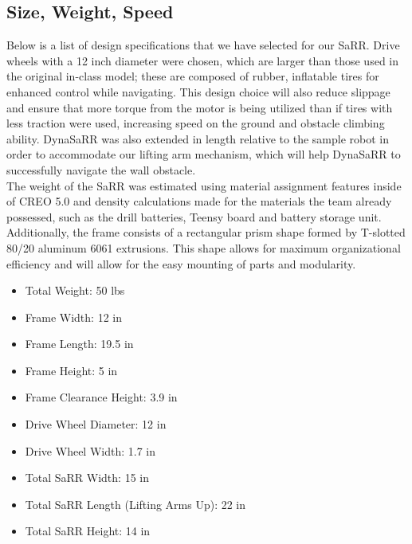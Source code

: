\documentclass[12pt]{article}
\begin{document}
\subsection{Size, Weight, Speed}
Below is a list of design specifications that we have selected for our SaRR. Drive wheels with a 12 inch diameter were chosen, which are larger than those used in the original in-class model; these are composed of rubber, inflatable tires for enhanced control while navigating. This design choice will also reduce slippage and ensure that more torque from the motor is being utilized than if tires with less traction were used, increasing speed on the ground and obstacle climbing ability. DynaSaRR was also extended in length relative to the sample robot in order to accommodate our lifting arm mechanism, which will help DynaSaRR to successfully navigate the wall obstacle.  \\
The weight of the SaRR was estimated using material assignment features inside of CREO 5.0 and density calculations made for the materials the team already possessed, such as the drill batteries, Teensy board and battery storage unit. \\
Additionally, the frame consists of a rectangular prism shape formed by T-slotted 80/20 aluminum 6061 extrusions. This shape allows for maximum organizational efficiency and will allow for the easy mounting of parts and modularity.
\begin{itemize}
\item Total Weight: 50 lbs
\item Frame Width: 12 in
\item Frame Length: 19.5 in
\item Frame Height: 5 in
\item Frame Clearance Height: 3.9 in
\item Drive Wheel Diameter: 12 in
\item Drive Wheel Width: 1.7 in
\item Total SaRR Width: 15 in
\item Total SaRR Length (Lifting Arms Up): 22 in
\item Total SaRR Height: 14 in
\end{itemize}
\\
\end{document}
